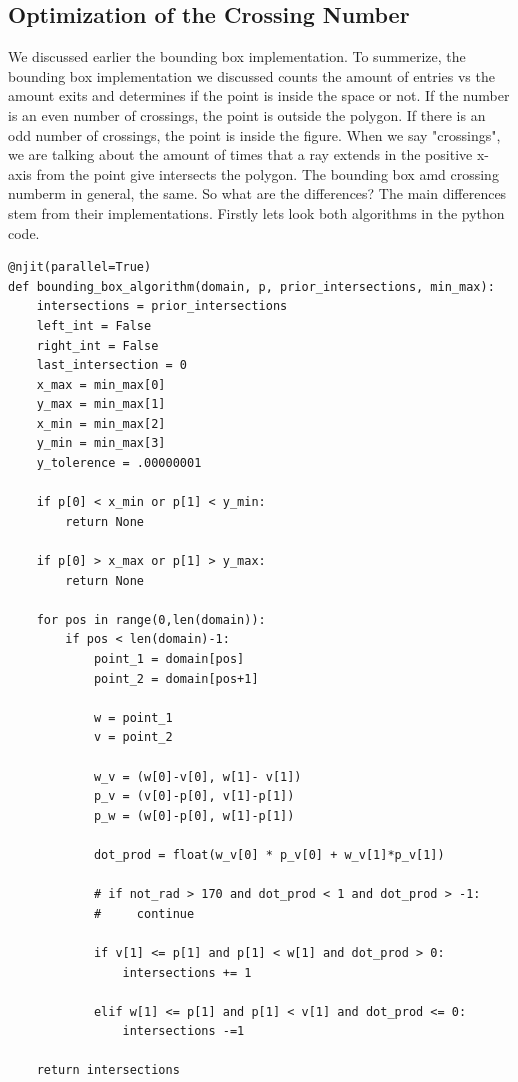 \documentclass{article}
\begin{document}
\subsection{Optimization of the Crossing Number}
We discussed earlier the bounding box implementation.
To summerize, the bounding box implementation we discussed counts the amount of entries vs the amount exits and determines if the point is inside the space or not.
If the number is an even number of crossings, the point is outside the polygon.
If there is an odd number of crossings, the point is inside the figure.
When we say "crossings", we are talking about the amount of times that a ray extends in the positive x-axis from the point give intersects the polygon.
The bounding box amd crossing numberm in general, the same.
So what are the differences?
The main differences stem from their implementations.
Firstly lets look both algorithms in the python code.

\begin{lstlisting}
@njit(parallel=True)
def bounding_box_algorithm(domain, p, prior_intersections, min_max):
    intersections = prior_intersections
    left_int = False
    right_int = False
    last_intersection = 0
    x_max = min_max[0]
    y_max = min_max[1]
    x_min = min_max[2]
    y_min = min_max[3]
    y_tolerence = .00000001

    if p[0] < x_min or p[1] < y_min:
        return None
            
    if p[0] > x_max or p[1] > y_max:
        return None

    for pos in range(0,len(domain)):
        if pos < len(domain)-1:
            point_1 = domain[pos]
            point_2 = domain[pos+1]

            w = point_1
            v = point_2
        
            w_v = (w[0]-v[0], w[1]- v[1])
            p_v = (v[0]-p[0], v[1]-p[1])
            p_w = (w[0]-p[0], w[1]-p[1])
            
            dot_prod = float(w_v[0] * p_v[0] + w_v[1]*p_v[1])

            # if not_rad > 170 and dot_prod < 1 and dot_prod > -1:
            #     continue

            if v[1] <= p[1] and p[1] < w[1] and dot_prod > 0:
                intersections += 1

            elif w[1] <= p[1] and p[1] < v[1] and dot_prod <= 0:
                intersections -=1

    return intersections

\end{lstlisting}
\end{document}
